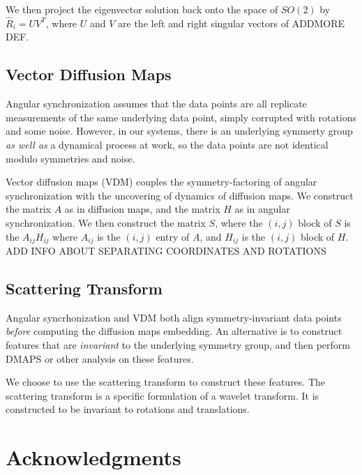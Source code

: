\documentclass[10pt]{article}
\begin{document}
We then project the eigenvector solution back onto the space of $SO(2)$ by $\hat{R}_i = U V^T$, where $U$ and $V$ are the left and right singular vectors of ADDMORE DEF.

\subsection*{Vector Diffusion Maps} 

Angular synchronization assumes that the data points are all replicate measurements of the same underlying data point, simply corrupted with rotations and some noise.
%
However, in our systems, there is an underlying symmerty group {\em as well as} a dynamical process at work, so the data points are not identical modulo symmetries and noise.

Vector diffusion maps (VDM) couples the symmetry-factoring of angular synchronization with the uncovering of dynamics of diffusion maps. 
%
We construct the matrix $A$ as in diffusion maps, and the matrix $H$ as in angular synchronization.
%
We then construct the matrix $S$, where the $(i,j)$ block of $S$ is the $A_{ij} H_{ij}$ where $A_{ij}$ is the $(i,j)$ entry of $A$, and $H_{ij}$ is the $(i,j)$ block of $H$. 
%
ADD INFO ABOUT SEPARATING COORDINATES AND ROTATIONS

\subsection*{Scattering Transform}
Angular syncrhonization and VDM both align symmetry-invariant data points {\em before} computing the diffusion maps embedding.
%
An alternative is to construct features that are {\em invariant} to the underlying symmetry group, and then perform DMAPS or other analysis on these features.

We choose to use the scattering transform to construct these features.
%
The scattering transform is a specific formulation of a wavelet transform.
%
It is constructed to be invariant to rotations and translations.
%


\section*{Acknowledgments}



\end{document}
